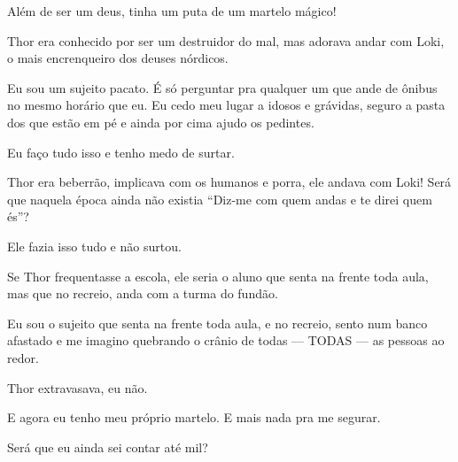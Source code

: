 Além de ser um deus, tinha um puta de um martelo mágico!

Thor era conhecido por ser um destruidor do mal, mas adorava andar com Loki, o mais encrenqueiro dos deuses nórdicos.

Eu sou um sujeito pacato. É só perguntar pra qualquer um que ande de ônibus no mesmo horário que eu. Eu cedo meu lugar a idosos e grávidas, seguro a pasta dos que estão em pé e ainda por cima ajudo os pedintes.

Eu faço tudo isso e tenho medo de surtar.

Thor era beberrão, implicava com os humanos e porra, ele andava com Loki! Será que naquela época ainda não existia ``Diz-me com quem andas e te direi quem és''?

Ele fazia isso tudo e não surtou.

Se Thor frequentasse a escola, ele seria o aluno que senta na frente toda aula, mas que no recreio, anda com a turma do fundão.

Eu sou o sujeito que senta na frente toda aula, e no recreio, sento num banco afastado e me imagino quebrando o crânio de todas --- TODAS --- as pessoas ao redor.

Thor extravasava, eu não.

E agora eu tenho meu próprio martelo. E mais nada pra me segurar.

Será que eu ainda sei contar até mil?
